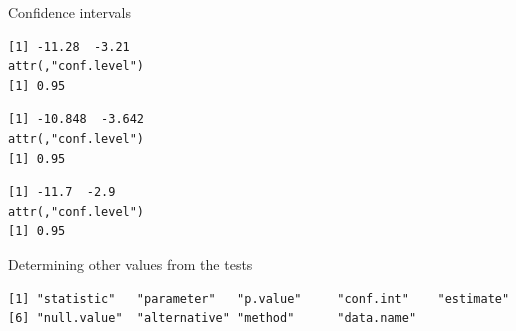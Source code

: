 \begin{frame}[fragile]{Confidence intervals}

\begin{Shaded}
\begin{Highlighting}[]
\OperatorTok{$}
\end{Highlighting}
\end{Shaded}

\begin{verbatim}
[1] -11.28  -3.21
attr(,"conf.level")
[1] 0.95
\end{verbatim}

\begin{Shaded}
\begin{Highlighting}[]
\OperatorTok{$}
\end{Highlighting}
\end{Shaded}

\begin{verbatim}
[1] -10.848  -3.642
attr(,"conf.level")
[1] 0.95
\end{verbatim}

\begin{Shaded}
\begin{Highlighting}[]
\OperatorTok{$}
\end{Highlighting}
\end{Shaded}

\begin{verbatim}
[1] -11.7  -2.9
attr(,"conf.level")
[1] 0.95
\end{verbatim}

\end{frame}

\begin{frame}[fragile]{Determining other values from the tests}

\begin{Shaded}
\begin{Highlighting}[]
\end{Highlighting}
\end{Shaded}

\begin{verbatim}
[1] "statistic"   "parameter"   "p.value"     "conf.int"    "estimate"   
[6] "null.value"  "alternative" "method"      "data.name"  
\end{verbatim}

\end{frame}

